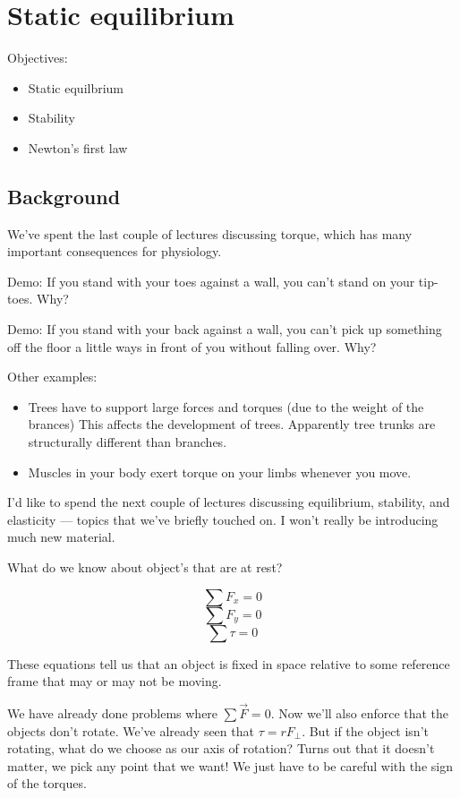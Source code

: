\section{Static equilibrium}
Objectives:
\begin{itemize}
\item Static equilbrium
\item Stability
\item Newton's first law
\end{itemize}

\subsection{Background}
We've spent the last couple of lectures discussing torque, which has many important consequences for physiology.

Demo: If you stand with your toes against a wall, you can't stand on your tip-toes. Why?

Demo: If you stand with your back against a wall, you can't pick up something off the floor a little ways in front of you without falling over. Why?

Other examples:
\begin{itemize}
\itemsep 0pt
\item Trees have to support large forces and torques (due to the weight of the brances) This affects the development of trees. Apparently tree trunks are structurally different than branches.
\item Muscles in your body exert torque on your limbs whenever you move.
\end{itemize}

I'd like to spend the next couple of lectures discussing equilibrium, stability, and elasticity --- topics that we've briefly touched on. I won't really be introducing much new material.

What do we know about object's that are at rest?

$$\sum F_x = 0$$
$$\sum F_y = 0$$
$$\sum \tau = 0$$

These equations tell us that an object is fixed in space relative to some reference frame that may or may not be moving.

We have already done problems where $\sum \vec{F}=0$. Now we'll also enforce that the objects don't rotate. We've already seen that $\tau=rF_\perp$. But if the object isn't rotating, what do we choose as our axis of rotation? Turns out that it doesn't matter, we pick any point that we want! We just have to be careful with the sign of the torques.



